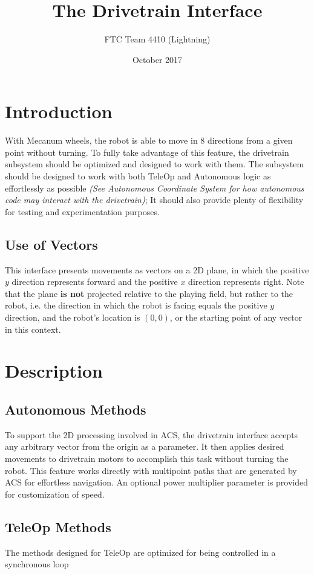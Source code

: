 \documentclass{article}
\begin{document}
\title{The Drivetrain Interface}
\author{FTC Team 4410 (Lightning)}
\date{October 2017}
\maketitle

\section{Introduction}
With Mecanum wheels, the robot is able to move in 8 directions from a given point without turning. To fully take advantage of this feature, the drivetrain subsystem should be optimized and designed to work with them. The subsystem should be designed to work with both TeleOp and Autonomous logic as effortlessly as possible \emph{(See Autonomous Coordinate System for how autonomous code may interact with the drivetrain)}; It should also provide plenty of flexibility for testing and experimentation purposes.

\subsection{Use of Vectors}
This interface presents movements as vectors on a 2D plane, in which the positive $y$ direction represents forward and the positive $x$ direction represents right. Note that the plane \textbf{is not} projected relative to the playing field, but rather to the robot, i.e. the direction in which the robot is facing equals the positive $y$ direction, and the robot's location is $(0,0)$, or the starting point of any vector in this context.

\section{Description}

\subsection{Autonomous Methods}
To support the 2D processing involved in ACS, the drivetrain interface accepts any arbitrary vector from the origin as a parameter. It then applies desired movements to drivetrain motors to accomplish this task without turning the robot. This feature works directly with multipoint paths that are generated by ACS for effortless navigation. An optional power multiplier parameter is provided for customization of speed.

\subsection{TeleOp Methods}
The methods designed for TeleOp are optimized for being controlled in a synchronous loop
\end{document}
